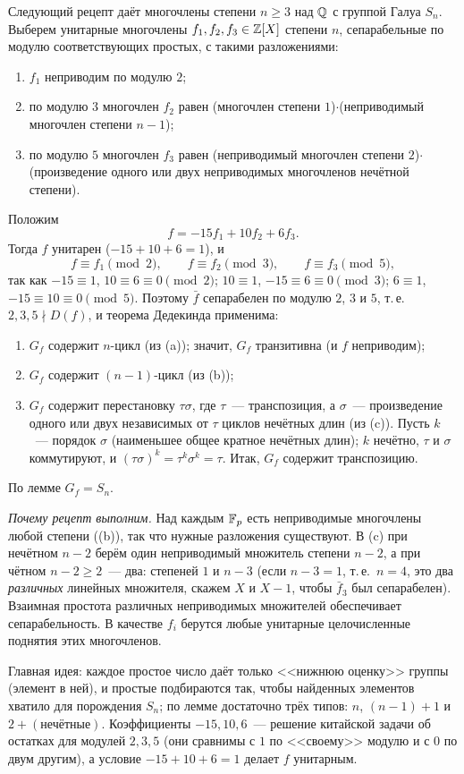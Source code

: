 \begin{example}
Следующий рецепт даёт многочлены степени $n\ge3$ над $\mathbb Q$ с группой Галуа $S_n$. Выберем унитарные многочлены
$f_1,f_2,f_3\in\mathbb Z[X]$ степени $n$, сепарабельные по модулю соответствующих простых, с такими разложениями:
\begin{enumerate}[label=(\alph*)]
\item $f_1$ неприводим по модулю $2$;
\item по модулю $3$ многочлен $f_2$ равен (многочлен степени $1$)$\cdot$(неприводимый многочлен степени $n-1$);
\item по модулю $5$ многочлен $f_3$ равен (неприводимый многочлен степени $2$)$\cdot$(произведение одного или двух
неприводимых многочленов нечётной степени).
\end{enumerate}
Положим
\[
f=-15f_1+10f_2+6f_3 .
\]
Тогда $f$ унитарен ($-15+10+6=1$), и
\[
f\equiv f_1\pmod2,\qquad f\equiv f_2\pmod3,\qquad f\equiv f_3\pmod5,
\]
так как $-15\equiv1$, $10\equiv6\equiv0\pmod2$; $10\equiv1$, $-15\equiv6\equiv0\pmod3$; $6\equiv1$, $-15\equiv10\equiv0\pmod5$.
Поэтому $\bar f$ сепарабелен по
модулю $2$, $3$ и $5$, т.\,е.\ $2,3,5\nmid D(f)$, и теорема Дедекинда применима:
\begin{enumerate}[label=(\roman*)]
\item $G_f$ содержит $n$-цикл (из (a)); значит, $G_f$ транзитивна (и $f$ неприводим);
\item $G_f$ содержит $(n-1)$-цикл (из (b));
\item $G_f$ содержит перестановку $\tau\sigma$, где $\tau$~--- транспозиция, а $\sigma$~--- произведение одного или двух
независимых от $\tau$ циклов нечётных длин (из (c)). Пусть $k$~--- порядок $\sigma$ (наименьшее общее кратное нечётных
длин); $k$ нечётно, $\tau$ и $\sigma$ коммутируют, и $(\tau\sigma)^k=\tau^k\sigma^k=\tau$. Итак, $G_f$ содержит транспозицию.
\end{enumerate}
По лемме  $G_f=S_n$.

\emph{Почему рецепт выполним.} Над каждым $\mathbb F_p$ есть неприводимые многочлены любой степени ((b)), так что
нужные разложения существуют. В (c) при нечётном $n-2$ берём один неприводимый множитель степени $n-2$, а при чётном
$n-2\ge2$~--- два: степеней $1$ и $n-3$ (если $n-3=1$, т.\,е.\ $n=4$, это два \emph{различных} линейных множителя, скажем
$X$ и $X-1$, чтобы $\bar f_3$ был сепарабелен). Взаимная простота различных неприводимых множителей обеспечивает
сепарабельность. В качестве $f_i$ берутся любые унитарные целочисленные поднятия этих многочленов.

Главная идея: каждое простое число даёт только <<нижнюю оценку>> группы (элемент в ней), и простые подбираются так,
чтобы найденных элементов хватило для порождения $S_n$; по лемме  достаточно трёх типов: $n$, $(n-1)+1$ и
$2+(\text{нечётные})$. Коэффициенты $-15,10,6$~--- решение китайской задачи об остатках для модулей $2,3,5$ (они
сравнимы с $1$ по <<своему>> модулю и с $0$ по двум другим), а условие $-15+10+6=1$ делает $f$ унитарным.
\end{example}

